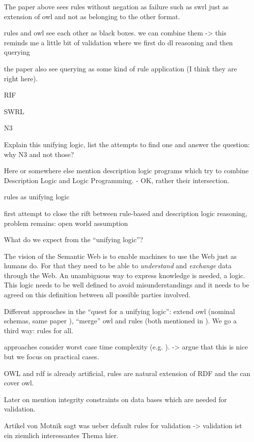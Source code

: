 The paper above sees rules without negation as failure such as swrl just as extension of owl and not as belonging to the other format.

rules and owl see each other as black boxes.
we can combine them
-> this reminds me a little bit of validation where we first do dl reasoning and then querying

the paper also see querying as some kind of rule application (I think they are right here).


RIF

SWRL

N3

\cite{N3Logic}

Explain this unifying logic, list the attempts to find one and answer the question: why N3 and not those?



Here or somewhere else mention description logic programs \cite{DLP} which try to combine Description Logic and Logic Programming. - OK, rather their intersection.

\cite{knorr} rules as unifying logic

\cite{unilogic} first attempt to close the rift between rule-based and description logic reasoning, problem remains: open world assumption


What do we expect from the ``unifying logic''?

The vision of the Semantic Web is to enable machines to use the Web just as humans do. For that they need to be able to \emph{understand} and \emph{exchange} data through the Web. 
An unambiguous way to express knowledge is needed, a logic. 
This logic needs to be well defined to avoid misunderstandings and it needs to be agreed on this definition between all possible parties involved.


Different approaches in the ``quest for a unifying logic'': extend owl (nominal schemas, same paper \cite{unilogic}), ``merge'' owl and rules (both mentioned in \cite{unilogic}). We go a third way: rules for all.

approaches consider worst case time complexity (e.g. \cite{unilogic}). -> argue that this is nice but we focus on practical cases.

OWL and rdf is already artificial, rules are natural extension of RDF and the can cover owl.

Later on mention integrity constraints on data bases which are needed for validation.

Artikel von Motnik \cite{DLASP} sagt was ueber default rules for validation -> validation ist ein ziemlich interessantes Thema hier.


